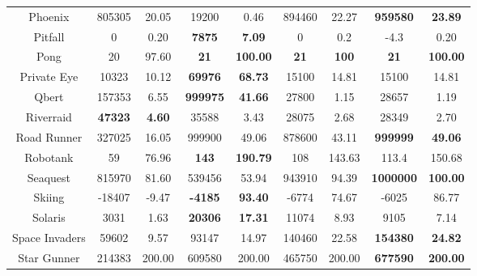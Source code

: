 \documentclass[nohyperref]{article}
\newcommand{\best}[1]{\textbf{#1}}
\theoremstyle{plain}
\begin{document}
\begin{table}[!hb]
\begin{center}
\begin{tabular}{| c | c c |  c c| c c| c c|}
 Phoenix        &805305        &20.05               &19200                 &0.46                           & 894460     &22.27    &\textbf{959580}          &\textbf{23.89}\\
 Pitfall        &0             &0.20                &\textbf{7875}          &\textbf{7.09   }               & 0                 &0.2            &-4.3            &0.20 \\
 Pong           &20            &97.60               &\textbf{21}            &\textbf{100.00 }               & \best{21}         &\best{100}     &\textbf{21}              &\textbf{100.00}       \\
 Private Eye    &10323         &10.12               &\textbf{69976}        &\textbf{68.73  }               & 15100             &14.81           &15100           &14.81  \\
 Qbert          &157353        &6.55                &\textbf{999975}       &\textbf{41.66  }               & 27800             &1.15            &28657           &1.19\\
 Riverraid      &\textbf{47323}&\textbf{4.60}       &35588                 &3.43                           & 28075             &2.68            &28349           &2.70\\
 Road Runner    &327025        &16.05               &999900        &49.06                 & 878600            &43.11          &\textbf{999999}          &\textbf{49.06}\\
 Robotank       &59            &76.96               &\textbf{143}           &\textbf{190.79 }               & 108               &143.63         &113.4           &150.68\\
 Seaquest       &815970        &81.60               &539456                 &53.94                 &943910	             &94.39   &\textbf{1000000}          &\textbf{100.00}\\
 Skiing         &-18407        &-9.47               &\textbf{-4185}        &\textbf{93.40  }               & -6774             &74.67           &-6025	         &86.77\\
 Solaris        &3031          &1.63                &\textbf{20306}        &\textbf{17.31  }               & 11074             &8.93            &9105            &7.14\\
 Space Invaders &59602         &9.57                &93147                 &14.97                          & 140460     &22.58    &\textbf{154380}          &\textbf{24.82}\\
 Star Gunner    &214383        &200.00              &609580      &200.00                         & 465750     &200.00&\textbf{677590}          &\textbf{200.00}     \\

\end{tabular}
\end{center}
\end{table}
\end{document}

